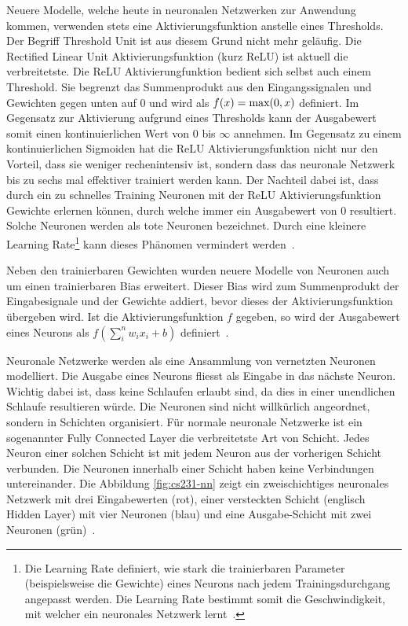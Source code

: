 Neuere Modelle, welche heute in neuronalen Netzwerken zur Anwendung kommen, verwenden stets eine Aktivierungsfunktion anstelle eines Thresholds. Der Begriff Threshold Unit ist aus diesem Grund nicht mehr geläufig. Die Rectified Linear Unit Aktivierungsfunktion (kurz ReLU) ist aktuell die verbreitetste. Die ReLU Aktivierungfunktion bedient sich selbst auch einem Threshold. Sie begrenzt das Summenprodukt aus den Eingangssignalen und Gewichten gegen unten auf 0 und wird als $f(x) = \textnormal{max}(0, x)$ definiert. Im Gegensatz zur Aktivierung aufgrund eines Thresholds kann der Ausgabewert somit einen kontinuierlichen Wert von 0 bis $\infty$ annehmen. Im Gegensatz zu einem kontinuierlichen Sigmoiden hat die ReLU Aktivierungsfunktion nicht nur den Vorteil, dass sie weniger rechenintensiv ist, sondern dass das neuronale Netzwerk bis zu sechs mal effektiver trainiert werden kann. Der Nachteil dabei ist, dass durch ein zu schnelles Training Neuronen mit der ReLU Aktivierungsfunktion Gewichte erlernen können, durch welche immer ein Ausgabewert von 0 resultiert. Solche Neuronen werden als tote Neuronen bezeichnet. Durch eine kleinere Learning Rate\footnote{Die Learning Rate definiert, wie stark die trainierbaren Parameter (beispielsweise die Gewichte) eines Neurons nach jedem Trainingsdurchgang angepasst werden. Die Learning Rate bestimmt somit die Geschwindigkeit, mit welcher ein neuronales Netzwerk lernt~\autocite{Goodfellow2016}.} kann dieses Phänomen vermindert werden~\autocite{cs231NN}.

Neben den trainierbaren Gewichten wurden neuere Modelle von Neuronen auch um einen trainierbaren Bias erweitert. Dieser Bias wird zum Summenprodukt der Eingabesignale und der Gewichte addiert, bevor dieses der Aktivierungsfunktion übergeben wird. Ist die Aktivierungsfunktion $f$ gegeben, so wird der Ausgabewert eines Neurons als $f(\sum_{i}^{n}{w_{i}x_{i}}+b)$ definiert~\autocite{cs231NN}.

Neuronale Netzwerke werden als eine Ansammlung von vernetzten Neuronen modelliert. Die Ausgabe eines Neurons fliesst als Eingabe in das nächste Neuron. Wichtig dabei ist, dass keine Schlaufen erlaubt sind, da dies in einer unendlichen Schlaufe resultieren würde. Die Neuronen sind nicht willkürlich angeordnet, sondern in Schichten organisiert. Für normale neuronale Netzwerke ist ein sogenannter Fully Connected Layer die verbreitetste Art von Schicht. Jedes Neuron einer solchen Schicht ist mit jedem Neuron aus der vorherigen Schicht verbunden. Die Neuronen innerhalb einer Schicht haben keine Verbindungen untereinander. Die Abbildung \ref{fig:cs231-nn} zeigt ein zweischichtiges neuronales Netzwerk mit drei Eingabewerten (rot), einer versteckten Schicht (englisch Hidden Layer) mit vier Neuronen (blau) und eine Ausgabe-Schicht mit zwei Neuronen (grün)~\autocite{cs231NN}.

